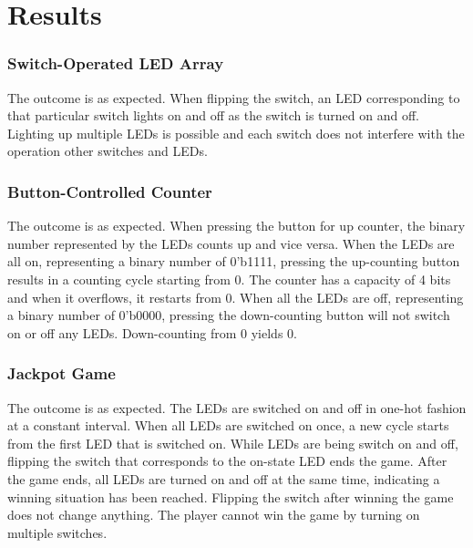 \documentclass[11pt,letterpaper,titlepage]{article}
\begin{document}
\newpage

\part{Results}

\section{Switch-Operated LED Array}

The outcome is as expected. When flipping the switch, an LED corresponding to that particular switch lights on and off as the switch is turned on and off. Lighting up multiple LEDs is possible and each switch does not interfere with the operation other switches and LEDs.



\section{Button-Controlled Counter}



The outcome is as expected. When pressing the button for up counter, the binary number represented by the LEDs counts up and vice versa. When the LEDs are all on, representing a binary number of 0'b1111, pressing the up-counting button results in a counting cycle starting from 0. The counter has a capacity of 4 bits and when it overflows, it restarts from 0. When all the LEDs are off, representing a binary number of 0'b0000, pressing the down-counting button will not switch on or off any LEDs. Down-counting from 0 yields 0.

\section{Jackpot Game}


The outcome is as expected. The LEDs are switched on and off in one-hot fashion at a constant interval. When all LEDs are switched on once, a new cycle starts from the first LED that is switched on. While LEDs are being switch on and off, flipping the switch that corresponds to the on-state LED ends the game. After the game ends, all LEDs are turned on and off at the same time, indicating a winning situation has been reached. Flipping the switch after winning the game does not change anything. The player cannot win the game by turning on multiple switches.
\end{document}

